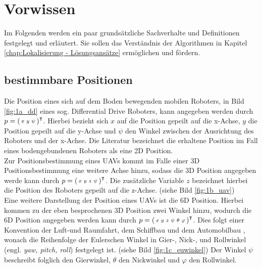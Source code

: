 \clearpage
\chapter{\textbf{Vorwissen}}\label{chap:Vorwissen}
Im Folgenden werden ein paar grundsätzliche Sachverhalte und Definitionen festgelegt und erläutert. Sie sollen das Verständnis der Algorithmen in Kapitel \ref{chap:Lokalisierung - Lösungsansätze} ermöglichen und fördern. 


\section{bestimmbare Positionen}\label{sec:bestimmbare Positionen}
Die Position eines sich auf dem Boden bewegenden mobilen Roboters, in Bild \ref{fig:1a_dd}  eines sog. Differential Drive Roboters, kann angegeben werden durch 
$p=\mathbf{\begin{psmallmatrix}
x & y & \psi
\end{psmallmatrix}}^\intercal$.
Hierbei bezieht sich $x$ auf die Position gepeilt auf die x-Achse, $y$ die Position gepeilt auf die y-Achse und $\psi$  den Winkel zwischen der Ausrichtung des Roboters und der x-Achse. Die Literatur bezeichnet die erhaltene Position im Fall eines bodengebundenen Roboters als eine 2D Position.\\
Zur Positionsbestimmung eines UAVs kommt im Falle einer 3D Positionsbestimmung eine weitere Achse hinzu, sodass die 3D Position angegeben werde kann durch
$p=\mathbf{\begin{psmallmatrix}
x & y & z & \psi
\end{psmallmatrix}}^\intercal$.
Die zusätzliche Variable $z$ bezeichnet hierbei die Position des Roboters gepeilt auf die z-Achse. (siehe Bild \ref{fig:1b_uav})\\
Eine weitere Darstellung der Position eines UAVs ist die 6D Position. Hierbei kommen zu der eben besprochenen 3D Position zwei Winkel hinzu, wodurch die 6D Position angegeben werden kann durch
$p=\mathbf{\begin{psmallmatrix}
x & y & z & \psi & \theta & \varphi
\end{psmallmatrix}}^\intercal$.
Dies folgt einer Konvention der Luft-und Raumfahrt, dem Schiffbau und dem Automobilbau \cite{website:cosmos-indirekt}, wonach die Reihenfolge der Eulerschen Winkel in Gier-, Nick-, und Rollwinkel (engl. \textit{yaw, pitch, roll}) festgelegt ist. (siehe Bild \ref{fig:1c_euwinkel}) Der Winkel $\psi$ beschreibt folglich den Gierwinkel, $\theta$ den Nickwinkel und $\varphi$ den Rollwinkel.\\

